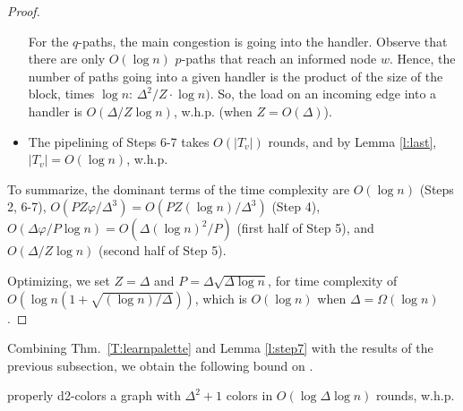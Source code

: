 \begin{proof}
\begin{itemize}
For the $q$-paths, the main congestion is going into the handler. Observe that there are only $O(\log n)$ $p$-paths that reach an informed node $w$. Hence, the number of paths going into a given handler is the product of the size of the block, times $\log n$: $\Delta^2/Z \cdot \log n)$. So, the load on an incoming edge into a handler is $O(\Delta/Z \log n)$, w.h.p. (when $Z = O(\Delta)$).

\item The pipelining of Steps 6-7 takes $O(|T_v|)$ rounds, and by Lemma \ref{l:last}, $|T_v| = O(\log n)$, w.h.p. 

\end{itemize}

To summarize, the dominant terms of the time complexity are $O(\log n)$ (Steps 2, 6-7), $O(PZ\varphi/\Delta^3) = O(PZ (\log n)/\Delta^3)$ (Step 4), $O(\Delta\varphi/P \log n) = O(\Delta(\log n)^2/P)$ (first half of Step 5), and $O(\Delta/Z \log n)$ (second half of Step 5).

Optimizing, we set $Z = \Delta$ and $P = \Delta \sqrt{\Delta\log n}$, 
for time complexity of $O(\log n (1 + \sqrt{(\log n)/\Delta}))$, which is $O(\log n)$ when $\Delta = \Omega(\log n)$. 
\end{proof}




Combining Thm.~\ref{T:learnpalette} and Lemma \ref{l:step7} with the results of the previous subsection, we obtain the following bound on .

\begin{theorem}
\label{thm:d2ColoringRand}
 properly d2-colors a graph with $\Delta^2+1$ colors in $O(\log \Delta \log n)$ rounds, w.h.p.
\end{theorem}
